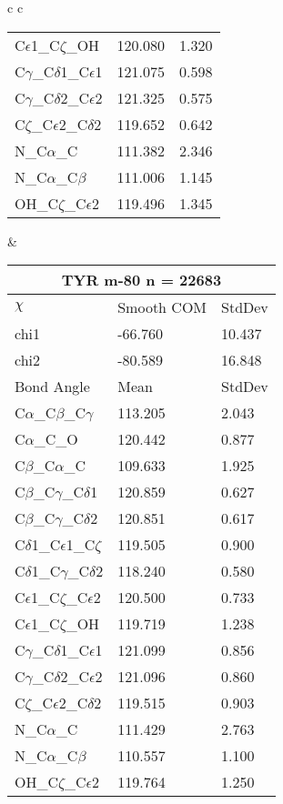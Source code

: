 \begin{longtable}{ c c }
\begin{tabular}{ l l l }
  C$\epsilon$1\_C$\zeta$\_OH & 120.080 & 1.320\\
  C$\gamma$\_C$\delta$1\_C$\epsilon$1 & 121.075 & 0.598\\
  C$\gamma$\_C$\delta$2\_C$\epsilon$2 & 121.325 & 0.575\\
  C$\zeta$\_C$\epsilon$2\_C$\delta$2 & 119.652 & 0.642\\
  N\_C$\alpha$\_C & 111.382 & 2.346\\
  N\_C$\alpha$\_C$\beta$ & 111.006 & 1.145\\
  OH\_C$\zeta$\_C$\epsilon$2 & 119.496 & 1.345\\
  \bottomrule
  \end{tabular}
  &
  \begin{tabular}{ l l l }
  \toprule
  \multicolumn{3}{c}{TYR \textbf{m-80} n = 22683} \\ \toprule
  $\chi$       & Smooth COM & StdDev \\ \midrule
  chi1 & -66.760 & 10.437 \\ 
  chi2 & -80.589 & 16.848 \\ \midrule
  Bond Angle   & Mean     & StdDev \\ \midrule
  C$\alpha$\_C$\beta$\_C$\gamma$ & 113.205 & 2.043\\
  C$\alpha$\_C\_O & 120.442 & 0.877\\
  C$\beta$\_C$\alpha$\_C & 109.633 & 1.925\\
  C$\beta$\_C$\gamma$\_C$\delta$1 & 120.859 & 0.627\\
  C$\beta$\_C$\gamma$\_C$\delta$2 & 120.851 & 0.617\\
  C$\delta$1\_C$\epsilon$1\_C$\zeta$ & 119.505 & 0.900\\
  C$\delta$1\_C$\gamma$\_C$\delta$2 & 118.240 & 0.580\\
  C$\epsilon$1\_C$\zeta$\_C$\epsilon$2 & 120.500 & 0.733\\
  C$\epsilon$1\_C$\zeta$\_OH & 119.719 & 1.238\\
  C$\gamma$\_C$\delta$1\_C$\epsilon$1 & 121.099 & 0.856\\
  C$\gamma$\_C$\delta$2\_C$\epsilon$2 & 121.096 & 0.860\\
  C$\zeta$\_C$\epsilon$2\_C$\delta$2 & 119.515 & 0.903\\
  N\_C$\alpha$\_C & 111.429 & 2.763\\
  N\_C$\alpha$\_C$\beta$ & 110.557 & 1.100\\
  OH\_C$\zeta$\_C$\epsilon$2 & 119.764 & 1.250\\
  \bottomrule
  \end{tabular}
  \\
  
\end{longtable}    

